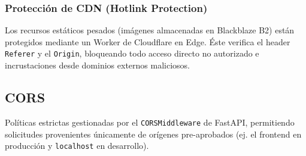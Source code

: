 \subsubsection{Protección de CDN (Hotlink Protection)}
Los recursos estáticos pesados (imágenes almacenadas en Blackblaze B2) están protegidos mediante un Worker de Cloudflare en Edge. Éste verifica el header \texttt{Referer} y el \texttt{Origin}, bloqueando todo acceso directo no autorizado e incrustaciones desde dominios externos maliciosos.

\subsection{CORS}
Políticas estrictas gestionadas por el \texttt{CORSMiddleware} de FastAPI, permitiendo solicitudes provenientes únicamente de orígenes pre-aprobados (ej. el frontend en producción y \texttt{localhost} en desarrollo).
